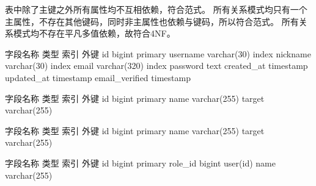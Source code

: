 {}\markdownRendererInterblockSeparator
{}表中除了主键之外所有属性均不互相依赖，符合范式。\markdownRendererInterblockSeparator
{}\markdownRendererInterblockSeparator
{}所有关系模式均只有一个主属性，不存在其他键码，同时非主属性也依赖与键码，所以符合范式。\markdownRendererInterblockSeparator
{}\markdownRendererInterblockSeparator
{}所有关系模式均不存在平凡多值依赖，故符合4NF。\markdownRendererInterblockSeparator
{}\markdownRendererInterblockSeparator
{}\markdownRendererInterblockSeparator
{}\begin{center}\markdownRendererInterblockSeparator
{}%
{{字段名称}%
{类型}%
{索引}%
{外键}%
}%
{{id}%
{bigint}%
{primary}%
{}%
}%
{{username}%
{varchar(30)}%
{index}%
{}%
}%
{{nickname}%
{varchar(30)}%
{index}%
{}%
}%
{{email}%
{varchar(320)}%
{index}%
{}%
}%
{{password}%
{text}%
{}%
{}%
}%
{{created\_at}%
{timestamp}%
{}%
{}%
}%
{{updated\_at}%
{timestamp}%
{}%
{}%
}%
{{email\_verified}%
{timestamp}%
{}%
{}%
}%
\markdownRendererInterblockSeparator
{}\end{center}\markdownRendererInterblockSeparator
{}\markdownRendererInterblockSeparator
{}\begin{center}\markdownRendererInterblockSeparator
{}%
{{字段名称}%
{类型}%
{索引}%
{外键}%
}%
{{id}%
{bigint}%
{primary}%
{}%
}%
{{name}%
{varchar(255)}%
{}%
{}%
}%
{{target}%
{varchar(255)}%
{}%
{}%
}%
\markdownRendererInterblockSeparator
{}\end{center}\markdownRendererInterblockSeparator
{}\markdownRendererInterblockSeparator
{}\begin{center}\markdownRendererInterblockSeparator
{}%
{{字段名称}%
{类型}%
{索引}%
{外键}%
}%
{{id}%
{bigint}%
{primary}%
{}%
}%
{{name}%
{varchar(255)}%
{}%
{}%
}%
{{target}%
{varchar(255)}%
{}%
{}%
}%
\markdownRendererInterblockSeparator
{}\end{center}\markdownRendererInterblockSeparator
{}\markdownRendererInterblockSeparator
{}\begin{center}\markdownRendererInterblockSeparator
{}%
{{字段名称}%
{类型}%
{索引}%
{外键}%
}%
{{id}%
{bigint}%
{primary}%
{}%
}%
{{role\_id}%
{bigint}%
{}%
{user(id)}%
}%
{{name}%
{varchar(255)}%
{}%
{}%
}%
\markdownRendererInterblockSeparator
{}\end{center}\relax